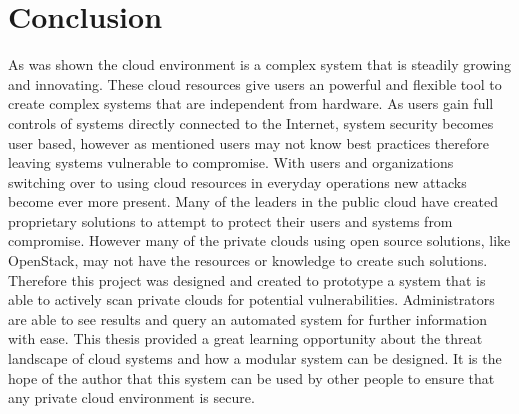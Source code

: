 \documentclass[12pt]{article}
\begin{document}
\section{Conclusion}
As was shown the cloud environment is a complex system that is steadily growing and innovating. These cloud resources give users an powerful and flexible tool to create complex systems that are independent from hardware. As users gain full controls of systems directly connected to the Internet, system security becomes user based, however as mentioned users may not know best practices therefore leaving systems vulnerable to compromise. With users and organizations switching over to using cloud resources in everyday operations new attacks become ever more present. Many of the leaders in the public cloud have created proprietary solutions to attempt to protect their users and systems from compromise. However many of the private clouds using open source solutions, like OpenStack, may not have the resources or knowledge to create such solutions. Therefore this project was designed and created to prototype a system that is able to actively scan private clouds for potential vulnerabilities. Administrators are able to see results and query an automated system for further information with ease. This thesis provided a great learning opportunity about the threat landscape of cloud systems and how a modular system can be designed. It is the hope of the author that this system can be used by other people to ensure that any private cloud environment is secure.


\newpage


\newpage
\appendix

\end{document}
